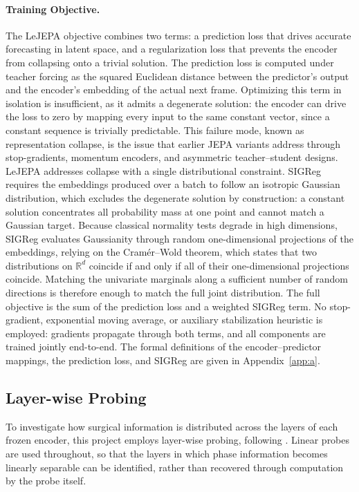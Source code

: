 \documentclass[11pt, a4paper]{article}
\begin{document}
\paragraph{Training Objective.} The LeJEPA objective combines two terms: a prediction loss that drives accurate forecasting in latent space, and a regularization loss that prevents the encoder from collapsing onto a trivial solution. The prediction loss is computed under teacher forcing as the squared Euclidean distance between the predictor's output and the encoder's embedding of the actual next frame. Optimizing this term in isolation is insufficient, as it admits a degenerate solution: the encoder can drive the loss to zero by mapping every input to the same constant vector, since a constant sequence is trivially predictable. This failure mode, known as representation collapse, is the issue that earlier JEPA variants address through stop-gradients, momentum encoders, and asymmetric teacher--student designs. LeJEPA addresses collapse with a single distributional constraint. SIGReg requires the embeddings produced over a batch to follow an isotropic Gaussian distribution, which excludes the degenerate solution by construction: a constant solution concentrates all probability mass at one point and cannot match a Gaussian target. Because classical normality tests degrade in high dimensions, SIGReg evaluates Gaussianity through random one-dimensional projections of the embeddings, relying on the Cram\'er--Wold theorem, which states that two distributions on $\mathbb{R}^d$ coincide if and only if all of their one-dimensional projections coincide. Matching the univariate marginals along a sufficient number of random directions is therefore enough to match the full joint distribution. The full objective is the sum of the prediction loss and a weighted SIGReg term. No stop-gradient, exponential moving average, or auxiliary stabilization heuristic is employed: gradients propagate through both terms, and all components are trained jointly end-to-end. The formal definitions of the encoder--predictor mappings, the prediction loss, and SIGReg are given in Appendix~\ref{app:a}.

\subsection{Layer-wise Probing}
\label{sec:probing}
To investigate how surgical information is distributed across the layers of each frozen encoder, this project employs layer-wise probing, following \textcite{joseph-2026}. Linear probes are used throughout, so that the layers in which phase information becomes linearly separable can be identified, rather than recovered through computation by the probe itself.
\end{document}
